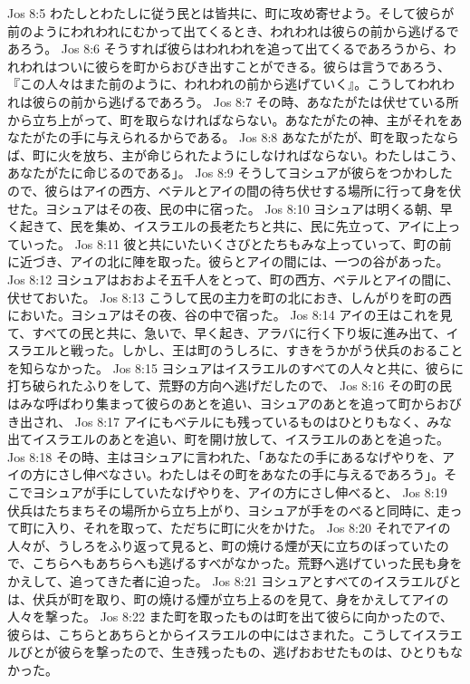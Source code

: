 Jos 8:5  わたしとわたしに従う民とは皆共に、町に攻め寄せよう。そして彼らが前のようにわれわれにむかって出てくるとき、われわれは彼らの前から逃げるであろう。
Jos 8:6  そうすれば彼らはわれわれを追って出てくるであろうから、われわれはついに彼らを町からおびき出すことができる。彼らは言うであろう、『この人々はまた前のように、われわれの前から逃げていく』。こうしてわれわれは彼らの前から逃げるであろう。
Jos 8:7  その時、あなたがたは伏せている所から立ち上がって、町を取らなければならない。あなたがたの神、主がそれをあなたがたの手に与えられるからである。
Jos 8:8  あなたがたが、町を取ったならば、町に火を放ち、主が命じられたようにしなければならない。わたしはこう、あなたがたに命じるのである」。
Jos 8:9  そうしてヨシュアが彼らをつかわしたので、彼らはアイの西方、ベテルとアイの間の待ち伏せする場所に行って身を伏せた。ヨシュアはその夜、民の中に宿った。
Jos 8:10  ヨシュアは明くる朝、早く起きて、民を集め、イスラエルの長老たちと共に、民に先立って、アイに上っていった。
Jos 8:11  彼と共にいたいくさびとたちもみな上っていって、町の前に近づき、アイの北に陣を取った。彼らとアイの間には、一つの谷があった。
Jos 8:12  ヨシュアはおおよそ五千人をとって、町の西方、ベテルとアイの間に、伏せておいた。
Jos 8:13  こうして民の主力を町の北におき、しんがりを町の西においた。ヨシュアはその夜、谷の中で宿った。
Jos 8:14  アイの王はこれを見て、すべての民と共に、急いで、早く起き、アラバに行く下り坂に進み出て、イスラエルと戦った。しかし、王は町のうしろに、すきをうかがう伏兵のおることを知らなかった。
Jos 8:15  ヨシュアはイスラエルのすべての人々と共に、彼らに打ち破られたふりをして、荒野の方向へ逃げだしたので、
Jos 8:16  その町の民はみな呼ばわり集まって彼らのあとを追い、ヨシュアのあとを追って町からおびき出され、
Jos 8:17  アイにもベテルにも残っているものはひとりもなく、みな出てイスラエルのあとを追い、町を開け放して、イスラエルのあとを追った。
Jos 8:18  その時、主はヨシュアに言われた、「あなたの手にあるなげやりを、アイの方にさし伸べなさい。わたしはその町をあなたの手に与えるであろう」。そこでヨシュアが手にしていたなげやりを、アイの方にさし伸べると、
Jos 8:19  伏兵はたちまちその場所から立ち上がり、ヨシュアが手をのべると同時に、走って町に入り、それを取って、ただちに町に火をかけた。
Jos 8:20  それでアイの人々が、うしろをふり返って見ると、町の焼ける煙が天に立ちのぼっていたので、こちらへもあちらへも逃げるすべがなかった。荒野へ逃げていった民も身をかえして、追ってきた者に迫った。
Jos 8:21  ヨシュアとすべてのイスラエルびとは、伏兵が町を取り、町の焼ける煙が立ち上るのを見て、身をかえしてアイの人々を撃った。
Jos 8:22  また町を取ったものは町を出て彼らに向かったので、彼らは、こちらとあちらとからイスラエルの中にはさまれた。こうしてイスラエルびとが彼らを撃ったので、生き残ったもの、逃げおおせたものは、ひとりもなかった。
